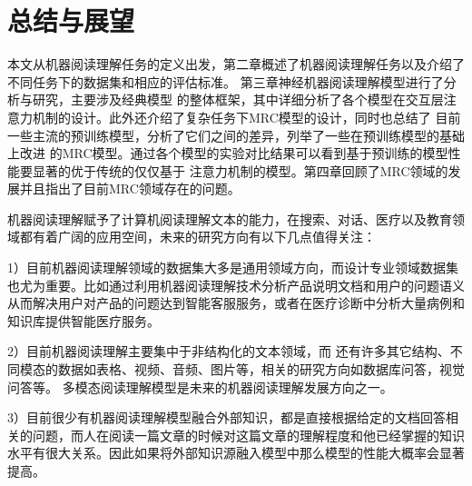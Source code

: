 \documentclass{article}
\begin{document}
%
%

\section{总结与展望}
本文从机器阅读理解任务的定义出发，第二章概述了机器阅读理解任务以及介绍了不同任务下的数据集和相应的评估标准。
第三章神经机器阅读理解模型进行了分析与研究，主要涉及经典模型
的整体框架，其中详细分析了各个模型在交互层注意力机制的设计。此外还介绍了复杂任务下MRC模型的设计，同时也总结了
目前一些主流的预训练模型，分析了它们之间的差异，列举了一些在预训练模型的基础上改进
的MRC模型。通过各个模型的实验对比结果可以看到基于预训练的模型性能要显著的优于传统的仅仅基于
注意力机制的模型。第四章回顾了MRC领域的发展并且指出了目前MRC领域存在的问题。

机器阅读理解赋予了计算机阅读理解文本的能力，在搜索、对话、医疗以及教育领域都有着广阔的应用空间，未来的研究方向有以下几点值得关注：

1）目前机器阅读理解领域的数据集大多是通用领域方向，而设计专业领域数据集也尤为重要。比如通过利用机器阅读理解技术分析产品说明文档和用户的问题语义从而解决用户对产品的问题达到智能客服服务，或者在医疗诊断中分析大量病例和知识库提供智能医疗服务。


2）目前机器阅读理解主要集中于非结构化的文本领域，而
还有许多其它结构、不同模态的数据如表格、视频、音频、图片等，相关的研究方向如数据库问答，视觉问答等。
多模态阅读理解模型是未来的机器阅读理解发展方向之一。

3）目前很少有机器阅读理解模型融合外部知识，都是直接根据给定的文档回答相关的问题，而人在阅读一篇文章的时候对这篇文章的理解程度和他已经掌握的知识水平有很大关系。因此如果将外部知识源融入模型中那么模型的性能大概率会显著提高。




\printbibliography[title={参考文献}]
\end{document}

